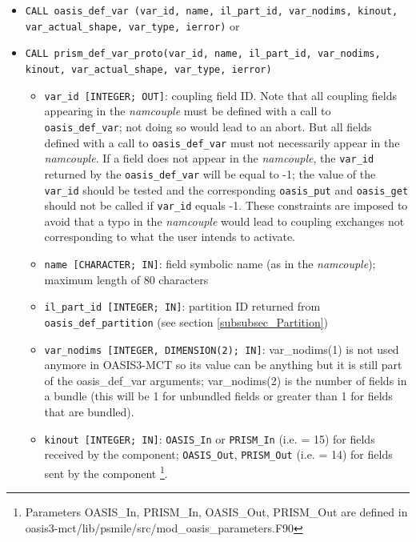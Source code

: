 \begin{itemize}

\item {\tt CALL oasis\_def\_var (var\_id, name, il\_part\_id,
    var\_nodims, kinout, \newline var\_actual\_shape, var\_type,
    ierror)} or

\item {\tt CALL prism\_def\_var\_proto(var\_id, name, il\_part\_id,
    var\_nodims, kinout, var\_actual\_shape, var\_type, ierror)}

  \begin{itemize}
  \item {\tt var\_id [INTEGER; OUT]}: coupling field ID.  Note that all 
      coupling fields appearing in the {\it namcouple} must be defined with 
      a call to {\tt oasis\_def\_var}; not doing so would lead to an abort.  
      But all fields defined with a call to {\tt oasis\_def\_var} must not necessarily 
      appear in the {\it namcouple}. If a field does not appear in the {\it namcouple}, 
      the {\tt var\_id} returned by the {\tt oasis\_def\_var} will be equal to -1; 
      the value of the {\tt var\_id} should be tested and the corresponding 
      {\tt oasis\_put} and {\tt oasis\_get} should not be called if {\tt var\_id} 
      equals -1. These constraints are imposed to avoid that a typo in the {\it namcouple}
       would lead to coupling exchanges not corresponding to what the user intends to activate. 
  \item {\tt name [CHARACTER; IN]}: field symbolic name (as in the
    {\it namcouple}); maximum length of 80 characters
  \item {\tt il\_part\_id [INTEGER; IN]}: partition ID returned from {\tt oasis\_def\_partition} (see section
    \ref{subsubsec_Partition})
  \item {\tt var\_nodims [INTEGER, DIMENSION(2); IN]}: var\_nodims(1)
    is not used anymore in OASIS3-MCT so its value can be anything but
    it is still part of the oasis\_def\_var arguments; var\_nodims(2) is the number
    of fields in a bundle (this will be 1 for unbundled fields or greater
    than 1 for fields that are bundled).  
  \item {\tt kinout [INTEGER; IN]}: {\tt OASIS\_In} or {\tt PRISM\_In}
    (i.e. = 15) for fields received by the component; {\tt OASIS\_Out},
    {\tt PRISM\_Out} (i.e. = 14) for fields sent by the component
    \footnote{Parameters OASIS\_In, PRISM\_In, OASIS\_Out, PRISM\_Out
      are defined in
      oasis3-mct/lib/psmile/src/mod\_oasis\_parameters.F90}.

\end{itemize}
\end{itemize}
